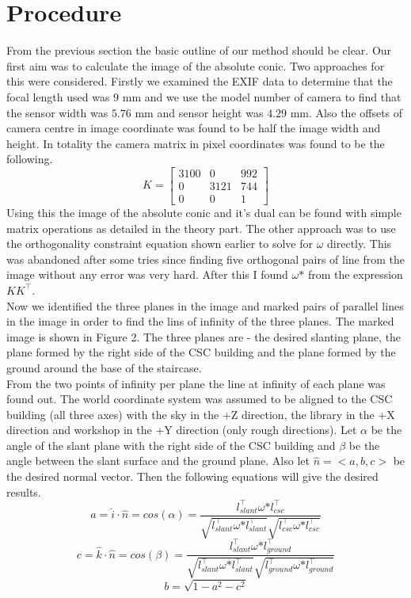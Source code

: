 \documentclass[12pt]{article}
\begin{document}
\section{Procedure}
From the previous section the basic outline of our method should be clear. Our first aim was to calculate the image of the absolute conic. Two approaches for this were considered. Firstly we examined the EXIF data to determine that the focal length used was $9$ mm and we use the model number of camera to find that the sensor width was $5.76$ mm and sensor height was $4.29$ mm. Also the offsets of camera centre in image coordinate was found to be half the image width and height. In totality the camera matrix in pixel coordinates was found to be the following.
$$ K=  \begin{bmatrix}3100 &0&992\\0 & 3121&744\\0 & 0 & 1 \end{bmatrix} $$
Using this the image of the absolute conic and it's dual can be found with simple matrix operations as detailed in the theory part. The other approach was to use the orthogonality constraint equation shown earlier to solve for $\omega$ directly. This was abandoned after some tries since finding five orthogonal pairs of line from the image without any error was very hard. After this I found $\omega \mbox{*}$ from the expression $K K^\top$. \\
Now we identified the three planes in the image and marked pairs of parallel lines in the image in order to find the lins of infinity of the three planes. The marked image is shown in Figure 2. The three planes are - the desired slanting plane, the plane formed by the right side of the CSC building and the plane formed by the ground around the base of the staircase.\\
From the two points of infinity per plane the line at infinity of each plane was found out. The world coordinate system was assumed to be aligned to the CSC building (all three axes) with the sky in the +Z direction, the library in the +X direction and workshop in the +Y direction (only rough directions). Let $\alpha$ be the angle of the slant plane with the right side of the CSC building and $\beta$ be the angle between the slant surface and the ground plane. Also let $\hat{n} = <a,b,c>$ be the desired normal vector. Then the following equations will give the desired results.
$$a = \hat{i} \cdot \hat{n}= cos(\alpha) = \dfrac{l_{slant}^\top \omega \mbox{*} l_{csc}^\top}{\sqrt{l_{slant}^\top \omega \mbox{*} l_{slant}^\top}\sqrt{l_{csc}^\top \omega \mbox{*} l_{csc}^\top}} $$
$$c = \hat{k} \cdot \hat{n}= cos(\beta) = \dfrac{l_{slant}^\top \omega \mbox{*} l_{ground}^\top}{\sqrt{l_{slant}^\top \omega \mbox{*} l_{slant}^\top}\sqrt{l_{ground}^\top \omega \mbox{*} l_{ground}^\top}} $$
$$ b = \sqrt{1-a^2-c^2}$$
\end{document}
